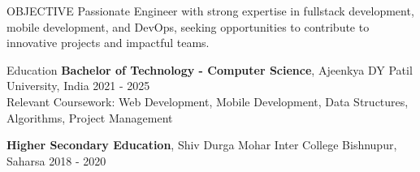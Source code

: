 \documentclass{resume} %
\begin{document}

\begin{rSection}{OBJECTIVE}
{Passionate Engineer with strong expertise in fullstack development, mobile development, and DevOps, seeking opportunities to contribute to innovative projects and impactful teams.}
\end{rSection}


\begin{rSection}{Education}
{\bf Bachelor of Technology - Computer Science}, Ajeenkya DY Patil University, India \hfill {2021 - 2025}\\
Relevant Coursework: Web Development, Mobile Development, Data Structures, Algorithms, Project Management

\vspace{0.5em} %

{\bf Higher Secondary Education}, Shiv Durga Mohar Inter College Bishnupur, Saharsa \hfill {2018 - 2020}
\end{rSection}


\end{document}
